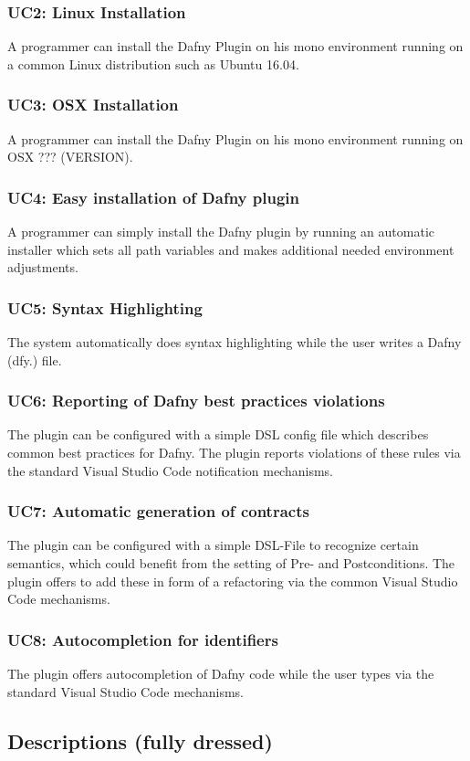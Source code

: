 \subsubsection{UC2: Linux Installation}
A programmer can install the Dafny Plugin on his mono environment running on a common Linux distribution such as Ubuntu 16.04.
\subsubsection{UC3: OSX Installation}
A programmer can install the Dafny Plugin on his mono environment running on OSX ??? (VERSION).
\subsubsection{UC4: Easy installation of Dafny plugin}
A programmer can simply install the Dafny plugin by running an automatic installer which sets all path variables and makes additional needed environment adjustments.
\subsubsection{UC5: Syntax Highlighting}
The system automatically does syntax highlighting while the user writes a Dafny (dfy.) file.
\subsubsection{UC6: Reporting of Dafny best practices violations}
The plugin can be configured with a simple DSL config file which describes common best practices for Dafny. The plugin reports violations of these rules via the standard Visual Studio Code notification mechanisms.
\subsubsection{UC7: Automatic generation of contracts}
The plugin can be configured with a simple DSL-File to recognize certain semantics, which could benefit from the setting of Pre- and Postconditions. The plugin offers to add these in form of a refactoring via the common Visual Studio Code mechanisms.
\subsubsection{UC8: Autocompletion for identifiers}
The plugin offers autocompletion of Dafny code while the user types via the standard Visual Studio Code mechanisms.
\subsection{Descriptions (fully dressed)}
